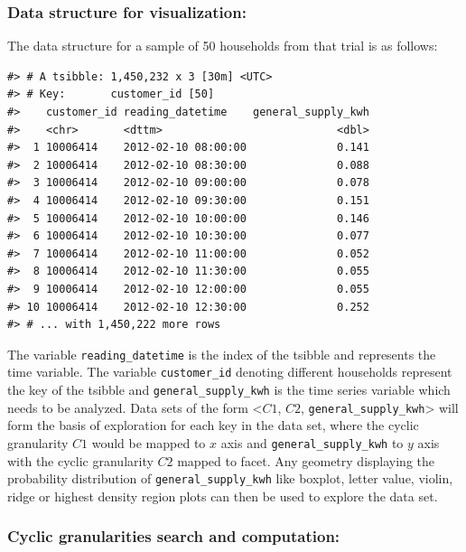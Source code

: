 \documentclass[12pt]{article}
\begin{document}
\hypertarget{data-structure-for-visualization}{%
\subsubsection{Data structure for visualization:}\label{data-structure-for-visualization}}

The data structure for a sample of 50 households from that trial is as follows:

\begin{verbatim}
#> # A tsibble: 1,450,232 x 3 [30m] <UTC>
#> # Key:       customer_id [50]
#>    customer_id reading_datetime    general_supply_kwh
#>    <chr>       <dttm>                           <dbl>
#>  1 10006414    2012-02-10 08:00:00              0.141
#>  2 10006414    2012-02-10 08:30:00              0.088
#>  3 10006414    2012-02-10 09:00:00              0.078
#>  4 10006414    2012-02-10 09:30:00              0.151
#>  5 10006414    2012-02-10 10:00:00              0.146
#>  6 10006414    2012-02-10 10:30:00              0.077
#>  7 10006414    2012-02-10 11:00:00              0.052
#>  8 10006414    2012-02-10 11:30:00              0.055
#>  9 10006414    2012-02-10 12:00:00              0.055
#> 10 10006414    2012-02-10 12:30:00              0.252
#> # ... with 1,450,222 more rows
\end{verbatim}

The variable \texttt{reading\_datetime} is the index of the tsibble and represents the time variable. The variable \texttt{customer\_id} denoting different households represent the key of the tsibble and \texttt{general\_supply\_kwh} is the time series variable which needs to be analyzed. Data sets of the form \textless{}\(C1\), \(C2\), \texttt{general\_supply\_kwh}\textgreater{} will form the basis of exploration for each key in the data set, where the cyclic granularity \(C1\) would be mapped to \(x\) axis and \texttt{general\_supply\_kwh} to \(y\) axis with the cyclic granularity \(C2\) mapped to facet. Any geometry displaying the probability distribution of \texttt{general\_supply\_kwh} like boxplot, letter value, violin,
ridge or highest density region plots can then be used to explore the data set.

\hypertarget{cyclic-granularities-search-and-computation}{%
\subsubsection{Cyclic granularities search and computation:}\label{cyclic-granularities-search-and-computation}}
\end{document}
